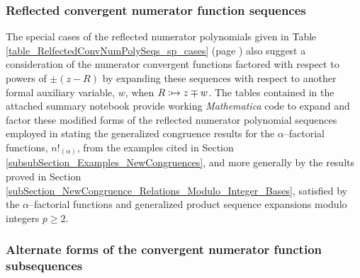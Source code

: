 \documentclass[12pt,reqno]{article}
\numberwithin{sfootnote}{section}
\newcommand{\tableref}[1]{Table \ref{#1} (page \pageref{#1})}
\numberwithin{equation}{section}
\theoremstyle{plain}
\theoremstyle{definition}
\theoremstyle{remark}
\newcommand{\defmapsto}{\ensuremath{\vcentcolon\mapsto}}
\newcommand{\Mm}[0]{\emph{Mathematica}}
\newcommand{\MultiFactorial}[2]{\ensuremath{#1!_{\left(#2\right)}}}
\begin{document}
\subsubsection{Reflected convergent numerator function sequences} 

The special cases of the reflected numerator polynomials given in 
\tableref{table_RelfectedConvNumPolySeqs_sp_cases} also 
suggest a consideration of the numerator convergent functions 
factored with respect to powers of $\pm (z-R)$ 
by expanding these sequences with respect to 
another formal auxiliary variable, $w$, when $R \defmapsto z \mp w$. 
The tables contained in the attached summary notebook 
provide working \Mm{} 
code to expand and factor these modified forms of the 
reflected numerator polynomial sequences employed in stating the 
generalized congruence results for the $\alpha$--factorial functions, 
$\MultiFactorial{n}{\alpha}$, from the examples cited in 
Section \ref{subsubSection_Examples_NewCongruences}, and 
more generally by the results proved in 
Section \ref{subSection_NewCongruence_Relations_Modulo_Integer_Bases}, 
satisfied by the $\alpha$--factorial functions and 
generalized product sequence expansions modulo integers $p \geq 2$. 

\subsubsection{Alternate forms of the 
               convergent numerator function subsequences}
\label{subsubSection_Properties_Of_ConvFn_Phz-AuxNumFn_Subsequences} 
\end{document}
